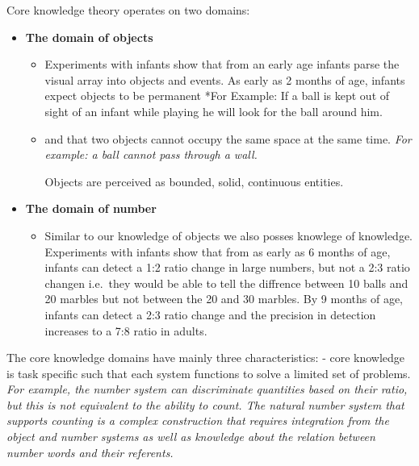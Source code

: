 \documentclass[11pt]{article}
\providecommand{\tightlist}{%
      \setlength{\itemsep}{0pt}\setlength{\parskip}{0pt}}
\begin{document}
Core knowledge theory operates on two domains:

\begin{itemize}
\tightlist
\item
  \textbf{The domain of objects}

  \begin{itemize}
  \item
    Experiments with infants show that from an early age infants parse
    the visual array into objects and events. As early as 2 months of
    age, infants expect objects to be permanent *For Example: If a ball
    is kept out of sight of an infant while playing he will look for the
    ball around him.
  \item
    and that two objects cannot occupy the same space at the same time.
    \emph{For example: a ball cannot pass through a wall.}

    Objects are perceived as bounded, solid, continuous entities.
  \end{itemize}
\item
  \textbf{The domain of number}

  \begin{itemize}
  \tightlist
  \item
    Similar to our knowledge of objects we also posses knowlege of
    knowledge. Experiments with infants show that from as early as 6
    months of age, infants can detect a 1:2 ratio change in large
    numbers, but not a 2:3 ratio changen i.e.~they would be able to tell
    the diffrence between 10 balls and 20 marbles but not between the 20
    and 30 marbles. By 9 months of age, infants can detect a 2:3 ratio
    change and the precision in detection increases to a 7:8 ratio in
    adults.
  \end{itemize}
\end{itemize}

The core knowledge domains have mainly three characteristics: - core
knowledge is task specific such that each system functions to solve a
limited set of problems. \emph{For example, the number system can
discriminate quantities based on their ratio, but this is not equivalent
to the ability to count. The natural number system that supports
counting is a complex construction that requires integration from the
object and number systems as well as knowledge about the relation
between number words and their referents.}
\end{document}
